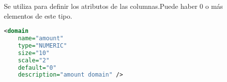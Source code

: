 Se utiliza para definir los atributos de las columnas.Puede haber 0 o más elementos de este tipo. 

\begin{lstlisting}[language=XML]
<domain
	name="amount"
	type="NUMERIC"
	size="10"
	scale="2"
	default="0"
	description="amount domain" />
\end{lstlisting}